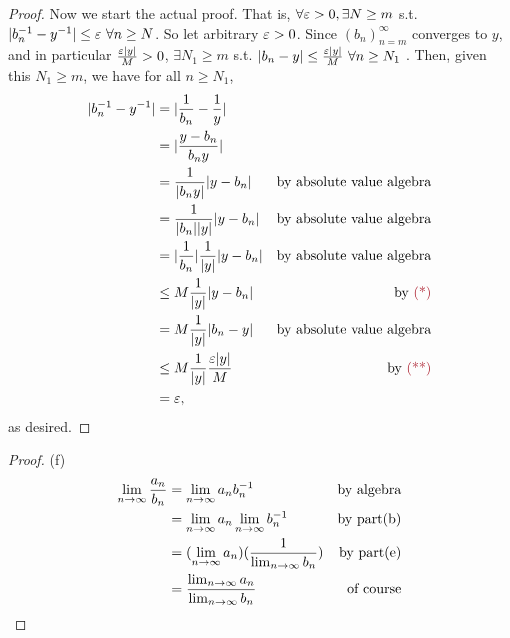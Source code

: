\begin{proof}
Now we start the actual proof.
That is, \(\forall \varepsilon > 0, \exists N \ge m\) s.t. \(\lvert b_n^{-1} - y^{-1}\rvert \le \varepsilon\ \forall n \ge N\).
So let arbitrary \(\varepsilon > 0\).
Since \((b_n)_{n = m}^{\infty}\) converges to \(y\), and in particular \(\frac{\varepsilon \lvert y\rvert}{M} > 0\),
\(\exists N_1 \ge m\) s.t. \(\lvert b_n - y\rvert \le \frac{\varepsilon \lvert y\rvert}{M}\ \forall n \ge N_1\) \MAROON{(**)}.
Then, given this \(N_1 \ge m\), we have for all \(n \ge N_1\),
\begin{align*}
    \abs{b_n^{-1} - y^{-1}} & = \abs{\frac{1}{b_n} - \frac{1}{y}} \\
                            & = \abs{\frac{y - b_n}{b_n y}} \\
                            & = \frac{1}{\abs{b_n y}} \abs{y - b_n} & \text{by absolute value algebra} \\
                            & = \frac{1}{\abs{b_n} \abs{y}} \abs{y - b_n} & \text{by absolute value algebra} \\
                            & = \abs{\frac{1}{b_n}} \frac{1}{\abs{y}} \abs{y - b_n} & \text{by absolute value algebra} \\
                            & \le M \frac{1}{\abs{y}} \abs{y - b_n} & \text{by \MAROON{(*)}} \\
                            & = M \frac{1}{\abs{y}} \abs{b_n - y} & \text{by absolute value algebra} \\
                            & \le M \frac{1}{\abs{y}} \frac{\varE \abs{y}}{M} & \text{by \MAROON{(**)}} \\
                            & = \varE,
\end{align*}
as desired.
\end{proof}

\begin{proof}(f)
\begin{align*}
\lim_{n \to \infty} \frac{a_n}{b_n} & = \lim_{n \to \infty} a_n b_n^{-1} & \text{by algebra} \\
                                & = \lim_{n \to \infty} a_n \lim_{n \to \infty} b_n^{-1} & \text {by part(b)} \\
                                & = (\lim_{n \to \infty} a_n) (\frac{1}{\lim_{n \to \infty} b_n}) & \text {by part(e)} \\
                                & = \frac{\lim_{n \to \infty} a_n}{\lim_{n \to \infty} b_n} & \text{of course}
\end{align*}
\end{proof}

